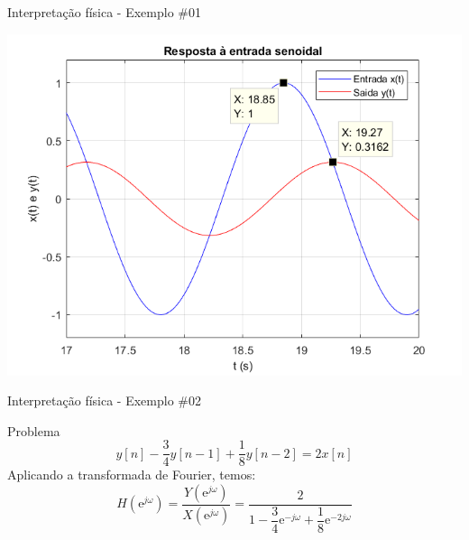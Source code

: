 \begin{frame}{Interpretação física - Exemplo \#01}
\centerline{\includegraphics[width=0.8\linewidth]{Figuras/Ch13/fig2.png}}
\end{frame}

\begin{frame}{Interpretação física - Exemplo \#02}
\begin{block}{Problema}
\vspace{0.2cm}
    \begin{equation*}
        y[n] - \frac{3}{4} y[n-1] + \frac{1}{8} y[n - 2] = 2 x[n]
    \end{equation*}
    Aplicando a transformada de Fourier, temos:\\
    \begin{equation*}
        H(\text{e}^{j\omega}) = \dfrac{Y(\text{e}^{j\omega})}{X(\text{e}^{j\omega})} = \dfrac{2}{1 - \dfrac{3}{4} \text{e}^{-j\omega} + \dfrac{1}{8} \text{e}^{-2 j\omega}}
    \end{equation*}
\end{block}
\end{frame}

